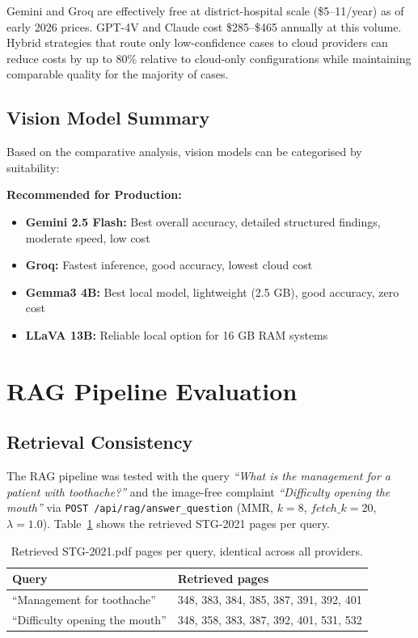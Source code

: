 \documentclass[12pt,a4paper]{report}
\begin{document}
Gemini and Groq are effectively free at district-hospital scale (\$5--11/year) as of early 2026 prices.
GPT-4V and Claude cost \$285--\$465 annually at this volume. Hybrid strategies
that route only low-confidence cases to cloud providers can reduce costs by up
to 80\% relative to cloud-only configurations while maintaining comparable
quality for the majority of cases.

\subsection{Vision Model Summary}

Based on the comparative analysis, vision models can be categorised by suitability:

\textbf{Recommended for Production:}
\begin{itemize}
    \item \textbf{Gemini 2.5 Flash:} Best overall accuracy, detailed structured findings, moderate speed, low cost
    \item \textbf{Groq:} Fastest inference, good accuracy, lowest cloud cost
    \item \textbf{Gemma3 4B:} Best local model, lightweight (2.5 GB), good accuracy, zero cost
    \item \textbf{LLaVA 13B:} Reliable local option for 16 GB RAM systems
\end{itemize}


\section{RAG Pipeline Evaluation}
\label{sec:results_rag}

\subsection{Retrieval Consistency}

The RAG pipeline was tested with the query \textit{``What is the management for a
patient with toothache?''} and the image-free complaint \textit{``Difficulty opening
the mouth''} via \texttt{POST /api/rag/answer\_question} (MMR, $k{=}8$,
$\mathit{fetch\_k}{=}20$, $\lambda{=}1.0$). Table~\ref{tab:retrieval_consistency}
shows the retrieved STG-2021 pages per query.

\begin{table}[H]
\centering
\caption{Retrieved STG-2021.pdf pages per query, identical across all providers.}
\label{tab:retrieval_consistency}
\small
\renewcommand{\arraystretch}{1.2}
\begin{tabularx}{\textwidth}{@{}l X@{}}
\toprule
\textbf{Query} & \textbf{Retrieved pages} \\
\midrule
``Management for toothache'' & 348, 383, 384, 385, 387, 391, 392, 401 \\
``Difficulty opening the mouth'' & 348, 358, 383, 387, 392, 401, 531, 532 \\
\bottomrule
\end{tabularx}
\end{table}
\end{document}
